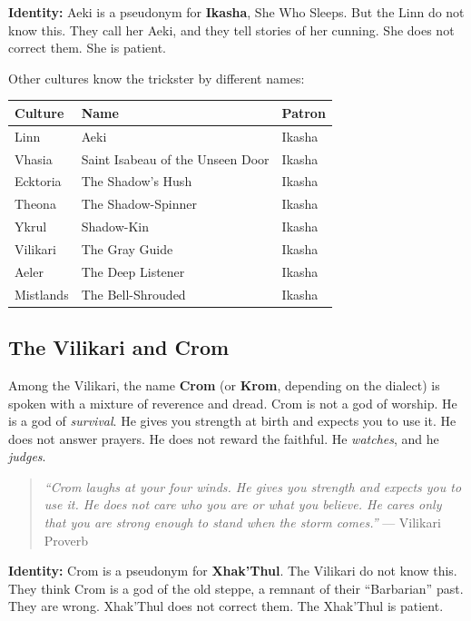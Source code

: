 \textbf{Identity:} Aeki is a pseudonym for \textbf{Ikasha}, She Who Sleeps. But the Linn do not know this. They call her Aeki, and they tell stories of her cunning. She does not correct them. She is patient.

Other cultures know the trickster by different names:

\begin{center}
\begin{tabular}{p{3cm}|p{4cm}|p{4cm}}
\toprule
\textbf{Culture} & \textbf{Name} & \textbf{Patron} \\
\midrule
Linn & Aeki & Ikasha \\
Vhasia & Saint Isabeau of the Unseen Door & Ikasha \\
Ecktoria & The Shadow's Hush & Ikasha \\
Theona & The Shadow-Spinner & Ikasha \\
Ykrul & Shadow-Kin & Ikasha \\
Vilikari & The Gray Guide & Ikasha \\
Aeler & The Deep Listener & Ikasha \\
Mistlands & The Bell-Shrouded & Ikasha \\
\bottomrule
\end{tabular}
\end{center}

\subsection{The Vilikari and Crom}

Among the Vilikari, the name \textbf{Crom} (or \textbf{Krom}, depending on the dialect) is spoken with a mixture of reverence and dread. Crom is not a god of worship. He is a god of \textit{survival}. He gives you strength at birth and expects you to use it. He does not answer prayers. He does not reward the faithful. He \textit{watches}, and he \textit{judges}.

\begin{quote}
\textit{``Crom laughs at your four winds. He gives you strength and expects you to use it. He does not care who you are or what you believe. He cares only that you are strong enough to stand when the storm comes.''}
--- Vilikari Proverb
\end{quote}

\textbf{Identity:} Crom is a pseudonym for \textbf{Xhak'Thul}. The Vilikari do not know this. They think Crom is a god of the old steppe, a remnant of their ``Barbarian'' past. They are wrong. Xhak'Thul does not correct them. The Xhak'Thul is patient.

